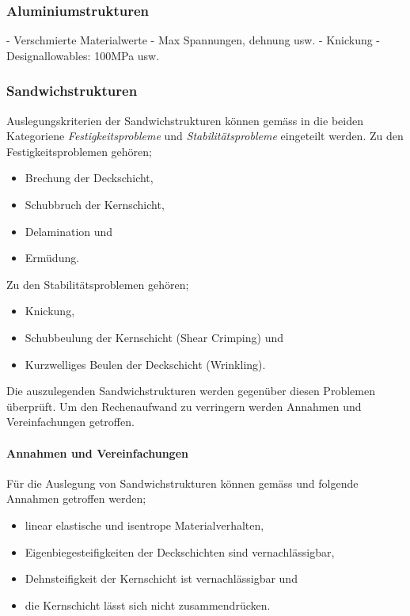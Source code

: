   \subsubsection{Aluminiumstrukturen}
    - Verschmierte Materialwerte
    - Max Spannungen, dehnung usw.
    - Knickung
    - Designallowables: 100MPa usw.

  \subsubsection{Sandwichstrukturen}
  Auslegungskriterien der Sandwichstrukturen können gemäss \cite{ETH} in die beiden Kategoriene \emph{Festigkeitsprobleme} und \emph{Stabilitätsprobleme} eingeteilt werden. Zu den Festigkeitsproblemen gehören;
  \begin{itemize}
    \item Brechung der Deckschicht,
    \item Schubbruch der Kernschicht,
    \item Delamination und
    \item Ermüdung.
  \end{itemize}

  Zu den Stabilitätsproblemen gehören;
  \begin{itemize}
    \item Knickung,
    \item Schubbeulung der Kernschicht (Shear Crimping) und
    \item Kurzwelliges Beulen der Deckschicht (Wrinkling).
  \end{itemize}

  Die auszulegenden Sandwichstrukturen werden gegenüber diesen Problemen überprüft. Um den Rechenaufwand zu verringern werden Annahmen und Vereinfachungen getroffen.

    \paragraph{Annahmen und Vereinfachungen}
    Für die Auslegung von Sandwichstrukturen können gemäss \cite{ETH} und \cite{klein} folgende Annahmen getroffen werden;
    \begin{itemize}
      \item linear elastische und isentrope Materialverhalten,
      \item Eigenbiegesteifigkeiten der Deckschichten sind vernachlässigbar,
      \item Dehnsteifigkeit der Kernschicht ist vernachlässigbar und
      \item die Kernschicht lässt sich nicht zusammendrücken.
    \end{itemize}

